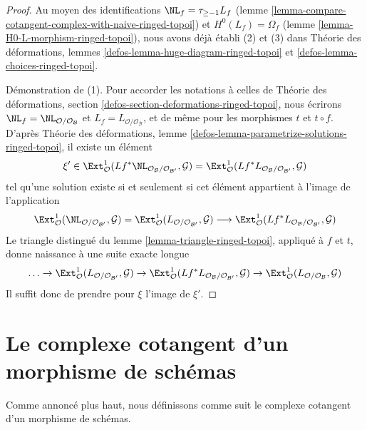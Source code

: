 \begin{proof}
Au moyen des identifications $\NL_f = \tau_{\geq -1}L_f$ (lemme
\ref{lemma-compare-cotangent-complex-with-naive-ringed-topoi}) et
$H^0(L_f) = \Omega_f$
(lemme \ref{lemma-H0-L-morphism-ringed-topoi}), nous avons déjà établi (2) et
(3) dans Théorie des déformations, lemmes
\ref{defos-lemma-huge-diagram-ringed-topoi} et
\ref{defos-lemma-choices-ringed-topoi}.

\medskip\noindent
Démonstration de (1). Pour accorder les notations à celles de Théorie des
déformations, section \ref{defos-section-deformations-ringed-topoi}, nous
écrirons
$\NL_f = \NL_{\mathcal{O}/\mathcal{O}_\mathcal{B}}$ et
$L_f = L_{\mathcal{O}/\mathcal{O}_\mathcal{B}}$, et de même pour les morphismes
$t$ et $t \circ f$. D'après Théorie des déformations, lemme
\ref{defos-lemma-parametrize-solutions-ringed-topoi}, il existe un élément
$$
\xi' \in
\Ext^1_\mathcal{O}(
Lf^*\NL_{\mathcal{O}_\mathcal{B}/\mathcal{O}_{\mathcal{B}'}}, \mathcal{G}) =
\Ext^1_\mathcal{O}(
Lf^*L_{\mathcal{O}_\mathcal{B}/\mathcal{O}_{\mathcal{B}'}}, \mathcal{G})
$$
tel qu'une solution existe si et seulement si cet élément appartient à l'image
de l'application
$$
\Ext^1_\mathcal{O}(
\NL_{\mathcal{O}/\mathcal{O}_{\mathcal{B}'}}, \mathcal{G}) =
\Ext^1_\mathcal{O}(
L_{\mathcal{O}/\mathcal{O}_{\mathcal{B}'}}, \mathcal{G})
\longrightarrow
\Ext^1_\mathcal{O}(
Lf^*L_{\mathcal{O}_\mathcal{B}/\mathcal{O}_{\mathcal{B}'}}, \mathcal{G})
$$
Le triangle distingué du lemme \ref{lemma-triangle-ringed-topoi}, appliqué à
$f$ et $t$, donne naissance à une suite exacte longue
$$
\ldots \to
\Ext^1_\mathcal{O}(
L_{\mathcal{O}/\mathcal{O}_{\mathcal{B}'}}, \mathcal{G}) \to
\Ext^1_\mathcal{O}(
Lf^*L_{\mathcal{O}_\mathcal{B}/\mathcal{O}_{\mathcal{B}'}}, \mathcal{G})
\to
\Ext^1_\mathcal{O}(
L_{\mathcal{O}/\mathcal{O}_\mathcal{B}}, \mathcal{G})
$$
Il suffit donc de prendre pour $\xi$ l'image de $\xi'$.
\end{proof}












\section{Le complexe cotangent d'un morphisme de schémas}
\label{section-cotangent-morphism-schemes}

\noindent
Comme annoncé plus haut, nous définissons comme suit le complexe cotangent d'un
morphisme de schémas.

